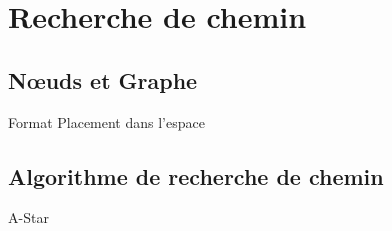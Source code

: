 \section{Recherche de chemin}

\subsection{Nœuds et Graphe}
Format
Placement dans l'espace

\subsection{Algorithme de recherche de chemin}
A-Star
